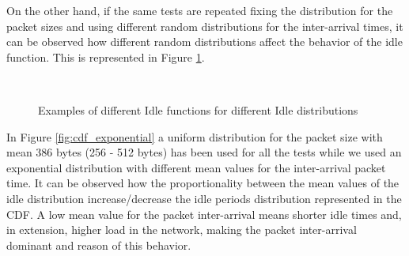 On the other hand, if the same tests are repeated fixing the distribution for the packet sizes and using different random distributions for the inter-arrival times, it can be observed how different random distributions affect the behavior of the idle function. This is represented in Figure \ref{fig:cdf_idle_compare}.

\begin{figure}[h!]
	\centering
	\\
	\caption{Examples of different Idle functions for different Idle distributions}
	\label{fig:cdf_idle_compare}
\end{figure}

In Figure \ref{fig:cdf_exponential} a uniform distribution for the packet size with mean 386 bytes (256 - 512 bytes) has been used for all the tests while we used an exponential distribution with different mean values for the inter-arrival packet time. It can be observed how the proportionality between the mean values of the idle distribution increase/decrease the idle periods distribution represented in the \acs{CDF}. A low mean value for the packet inter-arrival means shorter idle times and, in extension, higher load in the network, making the packet inter-arrival dominant and reason of this behavior.

